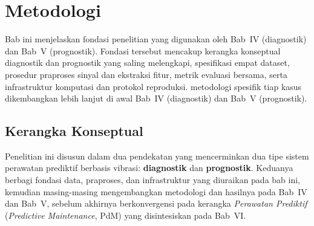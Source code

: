 
\chapter{Metodologi}
\label{bab:metodologi-umum}
\label{bab:dasar-teori}%

Bab ini menjelaskan fondasi penelitian yang digunakan oleh Bab~IV (diagnostik)
dan Bab~V (prognostik). Fondasi tersebut mencakup kerangka konseptual {\color{blue}diagnostik
dan prognostik} yang saling melengkapi, spesifikasi empat dataset,
prosedur praproses sinyal dan ekstraksi fitur, metrik evaluasi {\color{blue}bersama}, serta infrastruktur komputasi dan protokol reproduksi.
metodologi spesifik {\color{blue}tiap kasus} dikembangkan lebih lanjut di awal Bab~IV
({\color{blue}diagnostik}) dan Bab~V ({\color{blue}prognostik}).

\section{Kerangka Konseptual}
\label{sec:bab3_kerangka}

Penelitian ini disusun dalam {\color{blue}dua pendekatan} yang mencerminkan dua tipe  sistem perawatan prediktif berbasis vibrasi:
{\color{blue}\textbf{diagnostik}} dan {\color{blue}\textbf{prognostik}}.
{\color{blue}Keduanya} berbagi fondasi data, praproses, dan infrastruktur yang diuraikan
pada bab ini, kemudian masing-masing mengembangkan metodologi dan hasilnya
pada Bab~IV dan Bab~V, sebelum akhirnya berkonvergensi pada kerangka
\emph{Perawatan Prediktif} (\emph{Predictive Maintenance}, PdM) yang disintesiskan pada Bab~VI.

